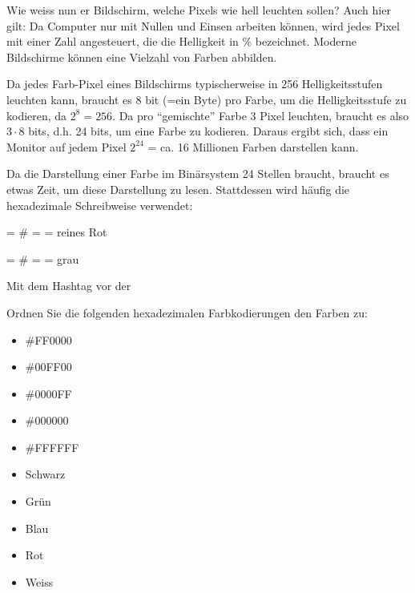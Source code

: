 Wie weiss nun er Bildschirm, welche Pixels wie hell leuchten sollen? Auch hier gilt: Da Computer nur mit Nullen und Einsen arbeiten können, wird jedes Pixel mit einer Zahl angesteuert, die die Helligkeit in \% bezeichnet. Moderne Bildschirme können eine Vielzahl von Farben abbilden.

\begin{myexample}
Da jedes Farb-Pixel eines Bildschirms typischerweise in 256 Helligkeitsstufen leuchten kann, braucht es 8 bit (=ein Byte) pro Farbe, um die Helligkeitsstufe zu kodieren, da $2^8=256$. Da pro ``gemischte'' Farbe 3 Pixel leuchten, braucht es also $3\cdot 8$ bits, d.h. 24 bits, um eine Farbe zu kodieren. Daraus ergibt sich, dass ein Monitor auf jedem Pixel $2^{24}$ = ca. 16 Millionen Farben darstellen kann.
\end{myexample}

\begin{myexample}
Da die Darstellung einer Farbe im Binärsystem 24 Stellen braucht, braucht es etwas Zeit, um diese Darstellung zu lesen. Stattdessen wird häufig die hexadezimale Schreibweise verwendet:

 = \# =  = reines Rot

 = \# =  = grau

Mit dem Hashtag vor der
\end{myexample}

\begin{myexercise}
Ordnen Sie die folgenden hexadezimalen Farbkodierungen den Farben zu:

\begin{minipage}[c]{.2\textwidth}
\begin{itemize}
\item \#FF0000
\item \#00FF00
\item \#0000FF
\item \#000000
\item \#FFFFFF
\end{itemize}
\end{minipage}
\begin{minipage}[c]{.2\textwidth}
\begin{itemize}
\item Schwarz
\item Grün
\item Blau
\item Rot
\item Weiss
\end{itemize}
\end{minipage}
\end{myexercise}

